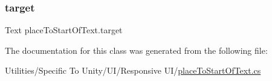 \subsubsection{\texorpdfstring{target}{target}}
{\footnotesize\ttfamily Text place\+To\+Start\+Of\+Text.\+target}



The documentation for this class was generated from the following file\+:\begin{DoxyCompactItemize}
\item 
Utilities/\+Specific To Unity/\+U\+I/\+Responsive U\+I/\hyperlink{place_to_start_of_text_8cs}{place\+To\+Start\+Of\+Text.\+cs}\end{DoxyCompactItemize}
